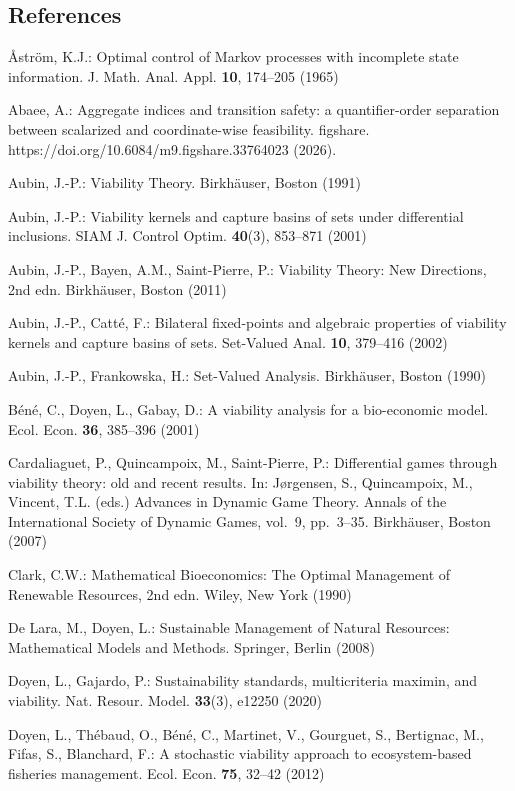 \documentclass[10pt,twocolumn]{article}
\theoremstyle{definition}
\begin{document}
\subsection{References}\label{references}
{\footnotesize

\r{A}str\"om, K.J.: Optimal control of Markov processes with incomplete state information. J. Math. Anal. Appl. \textbf{10}, 174--205 (1965)

Abaee, A.: Aggregate indices and transition safety: a quantifier-order separation between scalarized and coordinate-wise feasibility. figshare. https://doi.org/10.6084/m9.figshare.33764023 (2026).

Aubin, J.-P.: Viability Theory. Birkh\"auser, Boston (1991)

Aubin, J.-P.: Viability kernels and capture basins of sets under differential inclusions. SIAM J. Control Optim. \textbf{40}(3), 853--871 (2001)

Aubin, J.-P., Bayen, A.M., Saint-Pierre, P.: Viability Theory: New Directions, 2nd edn. Birkh\"auser, Boston (2011)

Aubin, J.-P., Catt\'e, F.: Bilateral fixed-points and algebraic properties of viability kernels and capture basins of sets. Set-Valued Anal. \textbf{10}, 379--416 (2002)

Aubin, J.-P., Frankowska, H.: Set-Valued Analysis. Birkh\"auser, Boston (1990)

B\'en\'e, C., Doyen, L., Gabay, D.: A viability analysis for a bio-economic
model. Ecol. Econ. \textbf{36}, 385--396 (2001)

Cardaliaguet, P., Quincampoix, M., Saint-Pierre, P.: Differential games
through viability theory: old and recent results. In: J\o{}rgensen, S.,
Quincampoix, M., Vincent, T.L. (eds.) Advances in Dynamic Game Theory.
Annals of the International Society of Dynamic Games, vol.~9, pp.~3--35.
Birkh\"auser, Boston (2007)

Clark, C.W.: Mathematical Bioeconomics: The Optimal Management of Renewable Resources, 2nd edn. Wiley, New York (1990)

De Lara, M., Doyen, L.: Sustainable Management of Natural Resources:
Mathematical Models and Methods. Springer, Berlin (2008)

Doyen, L., Gajardo, P.: Sustainability standards, multicriteria maximin,
and viability. Nat. Resour. Model. \textbf{33}(3), e12250 (2020)

Doyen, L., Th\'ebaud, O., B\'en\'e, C., Martinet, V., Gourguet, S., Bertignac,
M., Fifas, S., Blanchard, F.: A stochastic viability approach to
ecosystem-based fisheries management. Ecol. Econ. \textbf{75}, 32--42
(2012)

}
\end{document}
